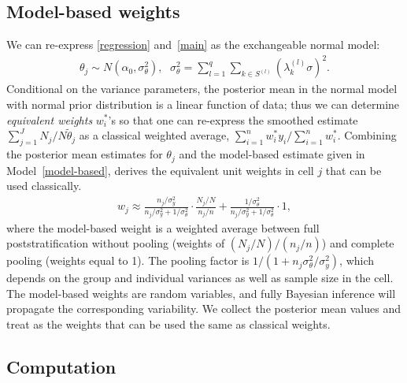 \documentclass[11pt]{article}
\numberwithin{figure}{section}
\numberwithin{table}{section}
\numberwithin{equation}{section}
\begin{document}
\subsection{Model-based weights}

We can re-express \eqref{regression} and~\eqref{main} as the exchangeable
normal model:	\begin{align} \label{theta-summary} \theta_j \sim N(\alpha_0,
  \sigma^2_{\theta})\mbox{, } \ \ \sigma^2_{\theta}=\sum_{l=1}^q\sum_{k\in
  S^{(l)}}(\lambda_k^{(l)}\sigma)^2.  \end{align} Conditional on the variance
  parameters, the posterior mean in the normal model with normal prior
  distribution is a linear function of data; thus we can determine {\em
  equivalent weights} $w^*_i$'s so that one can re-express the smoothed
  estimate $\sum_{j=1}^JN_j/N\tilde{\theta}_j$ as a classical weighted average,
  $\sum_{i=1}^n w^*_iy_i/\sum_{i=1}^n w^*_i$. Combining the posterior mean
  estimates for $\theta_j$ and the model-based estimate given in
  Model~\eqref{model-based}, \cite{gelman07} derives the equivalent unit
  weights in cell $j$ that can be used classically.  \begin{align}
    \label{model-w} w_j\approx
    \frac{n_j/\sigma^2_y}{n_j/\sigma^2_y+1/\sigma_{\theta}^2}\cdot\frac{N_j/N}{n_j/n}
    +  \frac{1/\sigma^2_{\theta}}{n_j/	\sigma^2_y+1/\sigma_{\theta}^2} \cdot
    1, \end{align} where the model-based weight is a weighted average between
    full poststratification without pooling (weights of $(N_j/N)/(n_j/n)$) and
    complete pooling (weights equal to 1). The pooling factor is $1/(1 +
    n_j\sigma^2_{\theta}/	\sigma^2_y)$, which depends on the group and
    individual variances as well as sample size in the cell. The model-based
    weights are random variables, and fully Bayesian inference will propagate
    the corresponding variability. We collect the posterior mean values and
    treat as the weights that can be used the same as classical weights.

\subsection{Computation}
\end{document}
